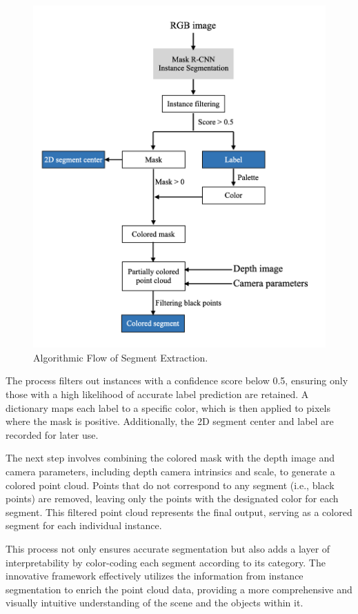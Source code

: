 \begin{figure}[H]
    \centering
    \includegraphics[width=.8\textwidth]{Pictures/Segment_extractor_diagram.png}
    \caption{Algorithmic Flow of Segment Extraction.}
    \label{fig:seg_pipeline}
\end{figure}

The process filters out instances with a confidence score below 0.5, ensuring only those with a high likelihood of accurate label prediction are retained. A dictionary maps each label to a specific color, which is then applied to pixels where the mask is positive. Additionally, the 2D segment center and label are recorded for later use. 

The next step involves combining the colored mask with the depth image and camera parameters, including depth camera intrinsics and scale, to generate a colored point cloud. Points that do not correspond to any segment (i.e., black points) are removed, leaving only the points with the designated color for each segment. This filtered point cloud represents the final output, serving as a colored segment for each individual instance.

This process not only ensures accurate segmentation but also adds a layer of interpretability by color-coding each segment according to its category. The innovative framework effectively utilizes the information from instance segmentation to enrich the point cloud data, providing a more comprehensive and visually intuitive understanding of the scene and the objects within it.

